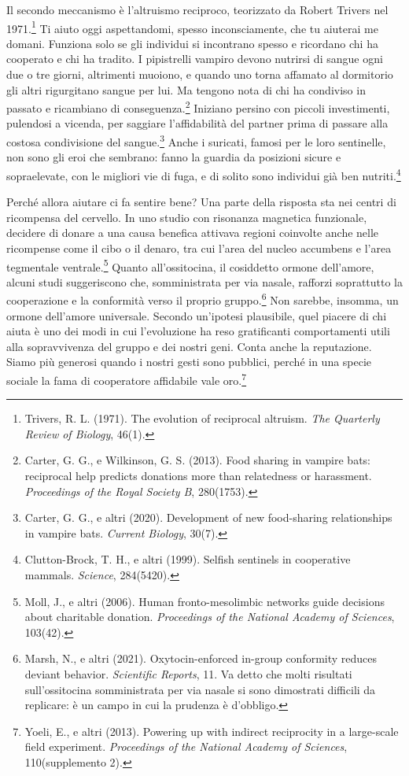 Il secondo meccanismo è l'altruismo reciproco, teorizzato da Robert Trivers nel 1971.\footnote{Trivers, R. L. (1971). The evolution of reciprocal altruism. \textit{The Quarterly Review of Biology}, 46(1).} Ti aiuto oggi aspettandomi, spesso inconsciamente, che tu aiuterai me domani. Funziona solo se gli individui si incontrano spesso e ricordano chi ha cooperato e chi ha tradito. I pipistrelli vampiro devono nutrirsi di sangue ogni due o tre giorni, altrimenti muoiono, e quando uno torna affamato al dormitorio gli altri rigurgitano sangue per lui. Ma tengono nota di chi ha condiviso in passato e ricambiano di conseguenza.\footnote{Carter, G. G., e Wilkinson, G. S. (2013). Food sharing in vampire bats: reciprocal help predicts donations more than relatedness or harassment. \textit{Proceedings of the Royal Society B}, 280(1753).} Iniziano persino con piccoli investimenti, pulendosi a vicenda, per saggiare l'affidabilità del partner prima di passare alla costosa condivisione del sangue.\footnote{Carter, G. G., e altri (2020). Development of new food-sharing relationships in vampire bats. \textit{Current Biology}, 30(7).} Anche i suricati, famosi per le loro sentinelle, non sono gli eroi che sembrano: fanno la guardia da posizioni sicure e sopraelevate, con le migliori vie di fuga, e di solito sono individui già ben nutriti.\footnote{Clutton-Brock, T. H., e altri (1999). Selfish sentinels in cooperative mammals. \textit{Science}, 284(5420).}

Perché allora aiutare ci fa sentire bene? Una parte della risposta sta nei centri di ricompensa del cervello. In uno studio con risonanza magnetica funzionale, decidere di donare a una causa benefica attivava regioni coinvolte anche nelle ricompense come il cibo o il denaro, tra cui l'area del nucleo accumbens e l'area tegmentale ventrale.\footnote{Moll, J., e altri (2006). Human fronto-mesolimbic networks guide decisions about charitable donation. \textit{Proceedings of the National Academy of Sciences}, 103(42).} Quanto all'ossitocina, il cosiddetto ormone dell'amore, alcuni studi suggeriscono che, somministrata per via nasale, rafforzi soprattutto la cooperazione e la conformità verso il proprio gruppo.\footnote{Marsh, N., e altri (2021). Oxytocin-enforced in-group conformity reduces deviant behavior. \textit{Scientific Reports}, 11. Va detto che molti risultati sull'ossitocina somministrata per via nasale si sono dimostrati difficili da replicare: è un campo in cui la prudenza è d'obbligo.} Non sarebbe, insomma, un ormone dell'amore universale. Secondo un'ipotesi plausibile, quel piacere di chi aiuta è uno dei modi in cui l'evoluzione ha reso gratificanti comportamenti utili alla sopravvivenza del gruppo e dei nostri geni. Conta anche la reputazione. Siamo più generosi quando i nostri gesti sono pubblici, perché in una specie sociale la fama di cooperatore affidabile vale oro.\footnote{Yoeli, E., e altri (2013). Powering up with indirect reciprocity in a large-scale field experiment. \textit{Proceedings of the National Academy of Sciences}, 110(supplemento 2).}

